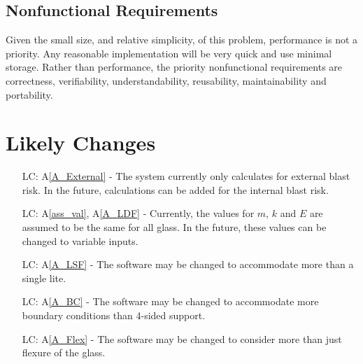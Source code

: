 \documentclass[12pt]{article}
\newcommand{\aref}[1]{A\ref{#1}}
\newcounter{lcnum} %
\begin{document}
\subsection{Nonfunctional Requirements}

Given the small size, and relative simplicity, of this problem, performance is
not a priority.  Any reasonable implementation will be very quick and use
minimal storage.  Rather than performance, the priority nonfunctional
requirements are correctness, verifiability, understandability, reusability, 
maintainability and portability.

\section{Likely Changes} \label{sec_like}

\noindent \begin{itemize}

\item[LC\refstepcounter{lcnum}\thelcnum\label{LC_int}:] \aref{A_External} - The
  system currently only calculates for external blast risk. In the future,
  calculations can be added for the internal blast risk.


\item[LC\refstepcounter{lcnum}\thelcnum\label{LC_variables}:] \aref{ass_val},
  \aref{A_LDF} - Currently, the values for $m$, $k$ and $E$ are assumed to be the
  same for all glass.  In the future, these values can be changed to variable
  inputs.

\item[LC\refstepcounter{lcnum}\thelcnum\label{LC_lite}:] \aref{A_LSF} - The
  software may be changed to accommodate more than a single lite.

\item[LC\refstepcounter{lcnum}\thelcnum\label{LC_BC}:] \aref{A_BC} - The
  software may be changed to accommodate more boundary conditions than 4-sided
  support.

\item[LC\refstepcounter{lcnum}\thelcnum\label{LC_Flex}:] \aref{A_Flex} - The
  software may be changed to consider more than just flexure of the glass.


\end{itemize}
\end{document}
